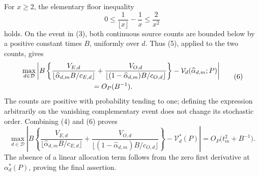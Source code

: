 For \(x\geq2\), the elementary floor inequality
\[
 0\leq\frac1{\lfloor x\rfloor}-\frac1x\leq\frac2{x^2}            \tag{5}
\]
holds.  On the event in (3), both continuous source counts are bounded below by a positive constant times \(B\), uniformly over \(d\).  Thus (5), applied to the two counts, gives
\[
\begin{aligned}
 &\max_{d\in\mathcal D}\left|
 B\left\{
 \frac{V_{E,d}}{\lfloor\widehat\alpha_{d,m}B/c_{E,d}\rfloor}
 +\frac{V_{O,d}}{\lfloor(1-\widehat\alpha_{d,m})B/c_{O,d}\rfloor}
 \right\}
 -\mathcal V_d(\widehat\alpha_{d,m};P)
 \right|\\
 &\hspace{35mm}=O_P(B^{-1}).
\end{aligned}                                                       \tag{6}
\]
The counts are positive with probability tending to one; defining the expression arbitrarily on the vanishing complementary event does not change its stochastic order.  Combining (4) and (6) proves
\[
 \max_{d\in\mathcal D}\left|B\left\{
 \frac{V_{E,d}}{\lfloor\widehat\alpha_{d,m}B/c_{E,d}\rfloor}
 +\frac{V_{O,d}}{\lfloor(1-\widehat\alpha_{d,m})B/c_{O,d}\rfloor}
 \right\}-\mathcal V_d^*(P)\right|
 =O_P\bigl(t_m^2+B^{-1}\bigr).
\]
The absence of a linear allocation term follows from the zero first derivative at \(\alpha_d^*(P)\), proving the final assertion.